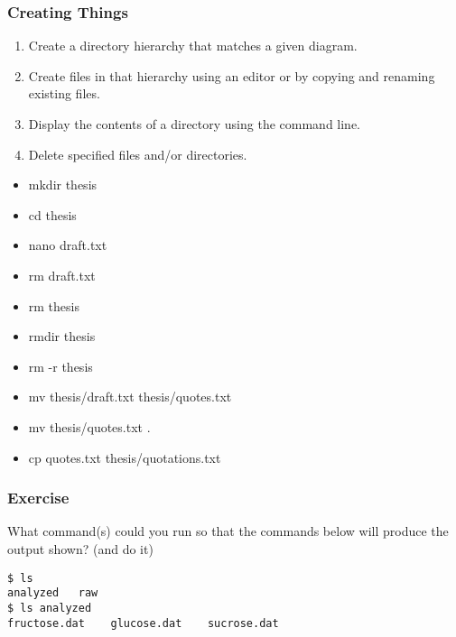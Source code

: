 \documentclass[xcolor=dvipsnames]{beamer}
\begin{document}
\begin{frame}
\frametitle{Creating Things}
\begin{enumerate}
\item    Create a directory hierarchy that matches a given diagram.
\item    Create files in that hierarchy using an editor or by copying and renaming existing files.
\item    Display the contents of a directory using the command line.
\item    Delete specified files and/or directories.
\end{enumerate}
\begin{multicols}{2}
\begin{itemize}
\item mkdir thesis
\item cd thesis
\item nano draft.txt
\item rm draft.txt
\item rm thesis
\item rmdir thesis
\item rm -r thesis
\item mv thesis/draft.txt thesis/quotes.txt
\item mv thesis/quotes.txt .
\item cp quotes.txt thesis/quotations.txt
\end{itemize}
\end{multicols}
\end{frame}

\begin{frame}[fragile]
\frametitle{Exercise}
What command(s) could you run so that the commands below will produce the output shown? (and do it)
\begin{verbatim}
$ ls
analyzed   raw
$ ls analyzed
fructose.dat    glucose.dat    sucrose.dat
\end{verbatim}
\end{frame}
\end{document}
